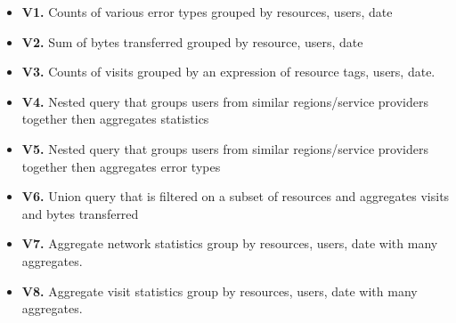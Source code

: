 \begin{itemize}[noitemsep]
\item \textbf{V1.} Counts of various error types grouped by resources, users, date
\item \textbf{V2.} Sum of bytes transferred grouped by resource, users, date
\item \textbf{V3.} Counts of visits grouped by an expression of resource tags, users, date.
\item \textbf{V4.} Nested query that groups users from similar regions/service providers together then aggregates statistics
\item \textbf{V5.} Nested query that groups users from similar regions/service providers together then aggregates error types
\item \textbf{V6.} Union query that is filtered on a subset of resources and aggregates visits and bytes transferred
\item \textbf{V7.} Aggregate network statistics group by resources, users, date with many aggregates.
\item \textbf{V8.} Aggregate visit statistics group by resources, users, date with many aggregates.
\end{itemize}
\fi

